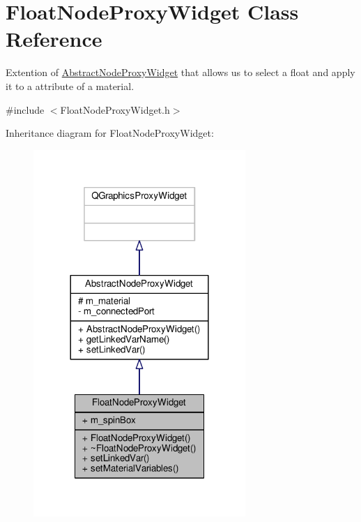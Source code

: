 \hypertarget{class_float_node_proxy_widget}{\section{Float\-Node\-Proxy\-Widget Class Reference}
\label{class_float_node_proxy_widget}
}


Extention of \hyperlink{class_abstract_node_proxy_widget}{Abstract\-Node\-Proxy\-Widget} that allows us to select a float and apply it to a attribute of a material.  




{\ttfamily \#include $<$Float\-Node\-Proxy\-Widget.\-h$>$}



Inheritance diagram for Float\-Node\-Proxy\-Widget\-:
\nopagebreak
\begin{figure}[H]
\begin{center}
\leavevmode
\includegraphics[width=228pt]{class_float_node_proxy_widget__inherit__graph}
\end{center}
\end{figure}


